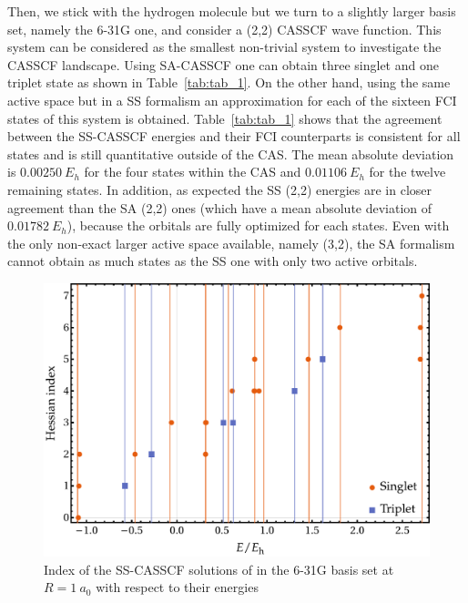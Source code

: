 \documentclass[aip,jcp,reprint,noshowkeys,superscriptaddress]{revtex4-1}
\begin{document}
Then, we stick with the hydrogen molecule but we turn to a slightly larger basis set, namely the 6-31G one, \cite{Ditchfield_1971} and consider a (2,2) CASSCF wave function.
This system can be considered as the smallest non-trivial system to investigate the CASSCF landscape.
Using SA-CASSCF one can obtain three singlet and one triplet state as shown in Table~\ref{tab:tab_1}.
On the other hand, using the same active space but in a SS formalism an approximation for each of the sixteen FCI states of this system is obtained.
Table~\ref{tab:tab_1} shows that the agreement between the SS-CASSCF energies and their FCI counterparts is consistent for all states and is still quantitative outside of the CAS.
The mean absolute deviation is $0.00250~E_h$ for the four states within the CAS and $0.01106~E_h$ for the twelve remaining states.
In addition, as expected the SS (2,2) energies are in closer agreement than the SA (2,2) ones (which have a mean absolute deviation of $0.01782~E_h$), because the orbitals are fully optimized for each states.
Even with the only non-exact larger active space available, namely (3,2), the SA formalism cannot obtain as much states as the SS one with only two active orbitals.

\begin{figure}
  \includegraphics[width=0.9\linewidth]{Figures/fig_3a.pdf}
  \caption{Index of the SS-CASSCF solutions of  in the 6-31G basis set at $R=1~a_0$ with respect to their energies
    \label{fig:fig_2}}
\end{figure}
\end{document}

